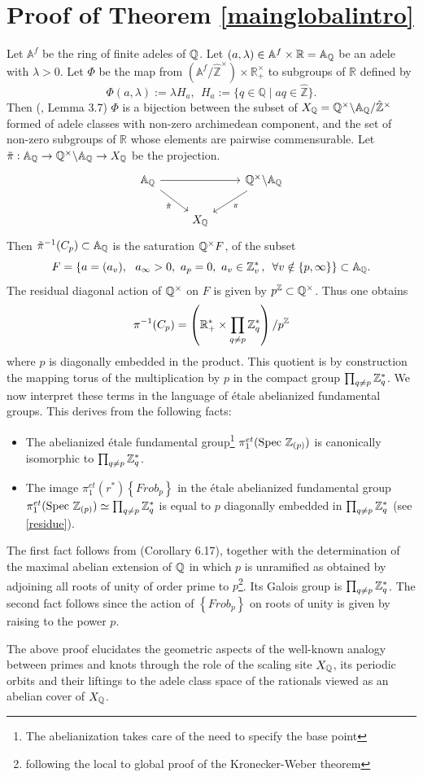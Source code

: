 
\section{Proof of Theorem \ref{mainglobalintro}}

Let $ \mathbb{A}^f$ be the ring of finite adeles of ${\mathbb Q}$. Let $(a,\lambda)\in \mathbb{A}^f\times \mathbb{R}= {\mathbb A}_{\mathbb Q}$ be an adele with $\lambda>0$. 
 Let $\Phi$ be the map from $\left(\mathbb{A}^f / \hat{\mathbb{Z}}^{\times}\right) \times \mathbb{R}_{+}^{\times}$ to subgroups of $\mathbb{R}$ defined by
$$
\Phi(a, \lambda):=\lambda H_a,\ \  H_a:=\{q \in \mathbb{Q} \mid a q \in \hat{\mathbb{Z}}\}.
$$
Then (\cite{CCas}, Lemma 3.7) $\Phi$ is a bijection between the subset of $X_{\mathbb Q}={\mathbb Q}^\times \backslash {\mathbb A}_{\mathbb Q}/{\hat{\mathbb{Z}}^\times}$  formed  of adele classes with non-zero archimedean component,   and the set of non-zero subgroups of $\mathbb{R}$ whose elements are pairwise commensurable. 
Let $\tilde \pi:{\mathbb A}_{\mathbb Q}\to{\mathbb Q}^\times \backslash {\mathbb A}_{\mathbb Q}\to X_{\mathbb Q}$ be the projection.
\[
\begin{tikzcd}
\A_\Q \arrow[rr]\arrow[dr,"\tilde\pi"'] & & \Q^\times \backslash \A_\Q\arrow[dl,"\pi"]\\
& X_\Q &
\end{tikzcd}
\]
Then  $\tilde\pi^{-1}(C_p)\subset {\mathbb A}_{\mathbb Q}$ is the saturation  ${\mathbb Q}^\times F$,  of the subset 
$$
F=\{a=(a_v), \ \ a_\infty >0, \ a_p=0, \ a_v\in \Z_v^* \qqq v\notin \{p,\infty\}\}\subset \A_\Q.
$$
The residual diagonal action of ${\mathbb Q}^\times$ on $F$ is given by  $p^{\mathbb{Z}}\subset {\mathbb Q}^\times$. Thus one obtains
\begin{equation}\label{inverseim}
\pi^{-1}(C_p)=\left(\mathbb{R}_+^*\times \prod_{q\neq p} \mathbb{Z}_q^*\right) /p^{\mathbb{Z}}
\end{equation}
where $p$ is diagonally embedded in the product. This quotient is by construction the mapping torus of the multiplication by $p$ in the compact group $\prod_{q\neq p} \mathbb{Z}_q^*$. We now interpret these terms in the language of \'etale abelianized fundamental groups. This derives from the following facts:

\begin{itemize}
\item The abelianized \'etale fundamental group\footnote{The abelianization takes care of the need to specify the base point} $\pi_1^{e t}({\rm Spec\,} \, \mathbb{Z}_{(p)})$  is canonically isomorphic to $\prod_{q\neq p} \mathbb{Z}_q^*$.
\item The image $\pi_1^{e t}(r^*)\left\{F r o b_{p}\right\}$ in the étale abelianized fundamental group $\pi_1^{e t}({\rm Spec\,} \, \mathbb{Z}_{(p)})\simeq \prod_{q\neq p} \mathbb{Z}_q^*$ is equal to $p$ diagonally embedded in $\prod_{q\neq p} \mathbb{Z}_q^*$ (see \eqref{residue}).
\end{itemize}
The first fact follows from \cite{Lenstra} (Corollary 6.17), together with the determination of the maximal abelian extension of ${\mathbb Q}$ in which $p$ is unramified as obtained by adjoining all roots of unity of order prime to $p$\footnote{following  the local to global proof of the Kronecker-Weber theorem}. Its Galois group is $\prod_{q\neq p} \mathbb{Z}_q^*$. The second fact follows since the action of $\left\{F r o b_{p}\right\}$ on roots of unity is given by raising to the power $p$.\vspace{.1in}

The above proof elucidates the geometric aspects of the well-known analogy between primes and knots through  the role of the scaling site $X_{\mathbb Q}$, its periodic orbits and their liftings to the adele class space of the rationals viewed as an abelian cover of $X_{\mathbb Q}$.

